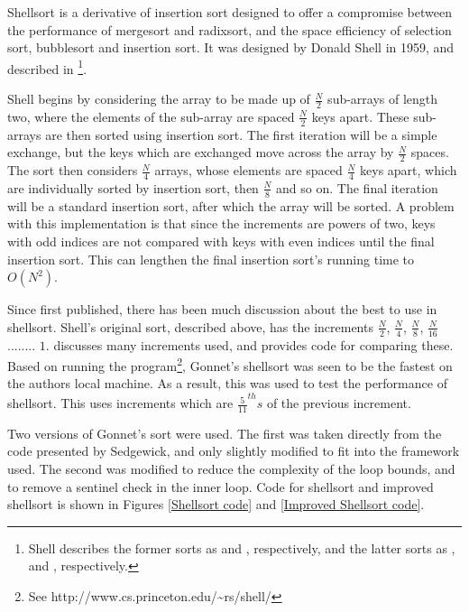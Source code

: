 \label{shell}

Shellsort is a derivative of insertion sort designed to offer a compromise
between the performance of mergesort and radixsort, and the space efficiency of
selection sort, bubblesort and insertion sort. It was designed by Donald Shell
in 1959, and described in \cite{Shell59}\footnote{Shell describes the former
sorts as  and , respectively, and the
latter sorts as ,  and
, respectively.}.

Shell begins by considering the array to be made up of $\frac{N}{2}$ sub-arrays
of length two, where the elements of the sub-array are spaced $\frac{N}{2}$ keys
apart.  These sub-arrays are then sorted using insertion sort. The first
iteration will be a simple exchange, but the keys which are exchanged move
across the array by $\frac{N}{2}$ spaces. The sort then considers $\frac{N}{4}$
arrays, whose elements are spaced $\frac{N}{4}$ keys apart, which are
individually sorted by insertion sort, then $\frac{N}{8}$ and so on. The final
iteration will be a standard insertion sort, after which the array will be
sorted. A problem with this implementation is that since the increments are
powers of two, keys with odd indices are not compared with keys with even
indices until the final insertion sort. This can lengthen the final insertion
sort's running time to $O(N^2)$.

Since first published, there has been much discussion about the best
 to use in shellsort. Shell's original sort, described above,
has the increments $\frac{N}{2}$, $\frac{N}{4}$, $\frac{N}{8}$, $\frac{N}{16}$
........ $1$. \cite{Sedgewick96} discusses many increments used, and provides
code for comparing these. Based on running the  program\footnote{See
http://www.cs.princeton.edu/\textasciitilde{}rs/shell/}, Gonnet's shellsort was
seen to be the fastest on the authors local machine. As a result, this was used
to test the performance of shellsort. This uses increments which are
$\frac{5}{11}^{th}s$ of the previous increment.

Two versions of Gonnet's sort were used. The first was taken directly from the
code presented by Sedgewick, and only slightly modified to fit into the
framework used.  The second was modified to reduce the complexity of the loop
bounds, and to remove a sentinel check in the inner loop. Code for shellsort and
improved shellsort is shown in Figures \ref{Shellsort code} and \ref{Improved
Shellsort code}.

